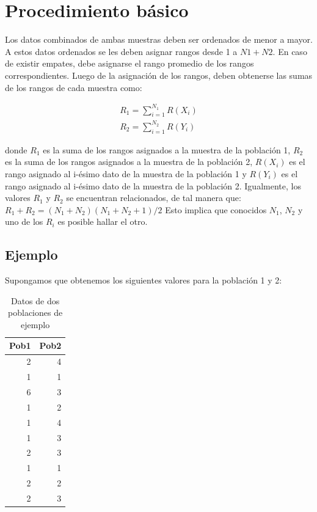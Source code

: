 \documentclass[]{book}
\theoremstyle{definition}
\theoremstyle{definition}
\theoremstyle{definition}
\theoremstyle{remark}
\begin{document}
\hypertarget{np-algoritmo}{%
\section{Procedimiento básico}\label{np-algoritmo}}

Los datos combinados de ambas muestras deben ser ordenados de menor a
mayor. A estos datos ordenados se les deben asignar rangos desde 1 a
\(N1+N2\). En caso de existir empates, debe asignarse el rango promedio
de los rangos correspondientes. Luego de la asignación de los rangos,
deben obtenerse las sumas de los rangos de cada muestra como:

\[
\begin{matrix}
R_1=\sum_{i=1}^{N_1}R(X_i)\\
R_2=\sum_{i=1}^{N_2}R(Y_i)
\end{matrix}
\]

donde \(R_1\) es la suma de los rangos asignados a la muestra de la
población 1, \(R_2\) es la suma de los rangos asignados a la muestra de
la población 2, \(R(X_i)\) es el rango asignado al i-ésimo dato de la
muestra de la población 1 y \(R(Y_i)\) es el rango asignado al i-ésimo
dato de la muestra de la población 2. Igualmente, los valores \(R_1\) y
\(R_2\) se encuentran relacionados, de tal manera que:
\(R_1+R_2=(N_1+N_2)(N_1+N_2+1)/2\) Esto implica que conocidos \(N_1\),
\(N_2\) y uno de los \(R_i\) es posible hallar el otro.

\hypertarget{ejemplo}{%
\subsection{Ejemplo}\label{ejemplo}}

Supongamos que obtenemos los siguientes valores para la población 1 y 2:

\begin{table}

\caption{\label{tab:ejemplo-ranking}Datos de dos poblaciones de ejemplo}
\centering
\begin{tabular}[t]{r|r}
\hline
Pob1 & Pob2\\
\hline
2 & 4\\
\hline
1 & 1\\
\hline
6 & 3\\
\hline
1 & 2\\
\hline
1 & 4\\
\hline
1 & 3\\
\hline
2 & 3\\
\hline
1 & 1\\
\hline
2 & 2\\
\hline
2 & 3\\
\hline
\end{tabular}
\end{table}
\end{document}
